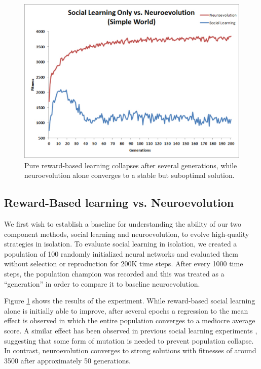 \documentclass{acm_proc_article-sp}
\begin{document}

\begin{figure}
  \centering
    \includegraphics[scale=.35]{social_learning_vs_neuroevolution.pdf}
  \caption{Pure reward-based learning collapses after several generations, while neuroevolution alone converges to a stable but suboptimal solution.}
  \label{fig:social-neuro}
\end{figure}

\subsection*{Reward-Based learning vs. Neuroevolution}

We first wish to establish a baseline for understanding the ability of our two component methods, social learning and neuroevolution, to evolve high-quality strategies in isolation. To evaluate social learning in isolation, we created a population of 100 randomly initialized neural networks and evaluated them without selection or reproduction for 200K time steps. After every 1000 time steps, the population champion was recorded and this was treated as a ``generation'' in order to compare it to baseline neuroevolution.

Figure \ref{fig:social-neuro} shows the results of the experiment. While reward-based social learning alone is initially able to improve, after several epochs a regression to the mean effect is observed in which the entire population converges to a mediocre average score. A similar effect has been observed in previous social learning experiments \cite{denaro1996cultural}, suggesting that some form of mutation is needed to prevent population collapse. In contrast, neuroevolution converges to strong solutions with fitnesses of around 3500 after approximately 50 generations.
\end{document}
